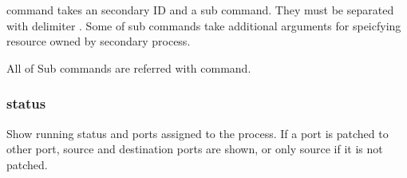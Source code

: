\documentclass[a4paper,11pt,openany,oneside,english]{sphinxmanual}
\begin{document}
 command takes an secondary ID and a sub command. They must be
separated with delimiter \sphinxcode{\sphinxupquote{;}}.
Some of sub commands take additional arguments for speicfying resource
owned by secondary process.

\begin{sphinxVerbatim}[commandchars=\\\{\},formatcom=\footnotesize]
\end{sphinxVerbatim}

All of Sub commands are referred with  command.

\begin{sphinxVerbatim}[commandchars=\\\{\},formatcom=\footnotesize]





\end{sphinxVerbatim}


\subsubsection{status}
\label{\detokenize{commands/secondary/spp_nfv:status}}\label{\detokenize{commands/secondary/spp_nfv:commands-spp-nfv-status}}
Show running status and ports assigned to the process. If a port is
patched to other port, source and destination ports are shown, or only
source if it is not patched.

\begin{sphinxVerbatim}[commandchars=\\\{\},formatcom=\footnotesize]
\end{sphinxVerbatim}
\end{document}
